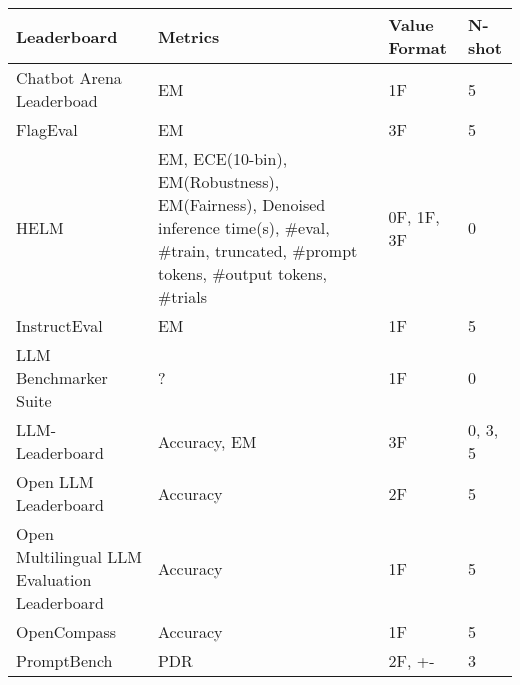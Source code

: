 \begin{tabular}{llll}
\toprule
Leaderboard & Metrics & Value Format & N-shot \\
\midrule
Chatbot Arena Leaderboad & EM & 1F & 5 \\
FlagEval & EM & 3F & 5 \\
HELM & EM, ECE(10-bin), EM(Robustness), EM(Fairness), Denoised inference time(s), \#eval, \#train, truncated, \#prompt tokens, \#output tokens, \#trials & 0F, 1F, 3F & 0 \\
InstructEval & EM & 1F & 5 \\
LLM Benchmarker Suite & ? & 1F & 0 \\
LLM-Leaderboard & Accuracy, EM & 3F & 0, 3, 5 \\
Open LLM Leaderboard & Accuracy & 2F & 5 \\
Open Multilingual LLM Evaluation Leaderboard & Accuracy & 1F & 5 \\
OpenCompass & Accuracy & 1F & 5 \\
PromptBench & PDR & 2F, +- & 3 \\
\bottomrule
\end{tabular}
